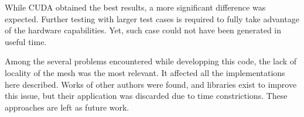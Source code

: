 While CUDA obtained the best results, a more significant difference was expected. Further testing with larger test cases is required to fully take advantage of the hardware capabilities. Yet, such case could not have been generated in useful time.

Among the several problems encountered while developping this code, the lack of locality of the mesh was the most relevant. It affected all the implementations here described. Works of other authors were found, and libraries exist to improve this issue, but their application was discarded due to time constrictions. These approaches are left as future work.
